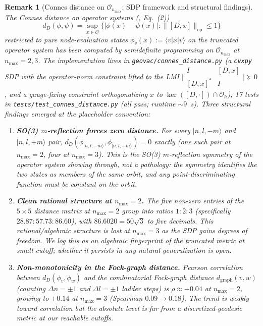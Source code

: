 \documentclass[11pt]{article}
\newtheorem{remark}{Remark}
\begin{document}
\begin{remark}[Connes distance on $\mathcal{O}_{n_{\max}}$: SDP framework
and structural findings]
\label{rem:connes_distance}
The Connes distance on operator systems
(\cite{connes_vs2021}, Eq.~(2))
\[
   d_D(\phi, \psi) = \sup_{x \in \mathcal{O}} \big\{ |\phi(x) - \psi(x)|
      : \|[D, x]\|_{\mathrm{op}} \le 1 \big\}
\]
restricted to pure node-evaluation states $\phi_v(x) := \langle v | x | v
\rangle$ on the truncated operator system has been computed by
semidefinite programming on $\mathcal{O}_{n_{\max}}$ at $n_{\max} = 2, 3$.
The implementation lives in \texttt{geovac/connes\_distance.py} (a
\texttt{cvxpy} SDP with the operator-norm constraint lifted to the LMI
$\bigl[\begin{smallmatrix} I & [D, x] \\ [D, x]^* & I \end{smallmatrix}\bigr]
\succeq 0$, and a gauge-fixing constraint orthogonalizing $x$ to
$\ker([D, \cdot]) \cap \mathcal{O}_h$); 17 tests in
\texttt{tests/test\_connes\_distance.py} (all pass; runtime ${\sim}9$~s).
Three structural findings emerged at the placeholder convention:

\begin{enumerate}
\item \textbf{SO(3) $m$-reflection forces zero distance.}  For every
   $|n, l, -m\rangle$ and $|n, l, +m\rangle$ pair, $d_D(\phi_{|n,l,-m\rangle},
   \phi_{|n,l,+m\rangle}) = 0$ exactly (one such pair at $n_{\max} = 2$,
   four at $n_{\max} = 3$).  This is the SO(3) $m$-reflection symmetry
   of the operator system showing through, not a pathology: the symmetry
   identifies the two states as members of the same orbit, and any
   point-discriminating function must be constant on the orbit.

\item \textbf{Clean rational structure at $n_{\max} = 2$.}  The five
   non-zero entries of the $5 \times 5$ distance matrix at $n_{\max} = 2$
   group into ratios $1 : 2 : 3$ (specifically $28.87 : 57.73 : 86.60$),
   with $86.6020 = 50\sqrt{3}$ to five decimals.  This rational/algebraic
   structure is lost at $n_{\max} = 3$ as the SDP gains degrees of
   freedom.  We log this as an algebraic fingerprint of the truncated
   metric at small cutoff; whether it persists in any natural
   generalization is open.

\item \textbf{Non-monotonicity in the Fock-graph distance.}  Pearson
   correlation between $d_D(\phi_v, \phi_w)$ and the combinatorial
   Fock-graph distance $d_{\mathrm{graph}}(v, w)$ (counting $\Delta n =
   \pm 1$ and $\Delta l = \pm 1$ ladder steps) is $\rho \approx -0.04$
   at $n_{\max} = 2$, growing to $+0.14$ at $n_{\max} = 3$ (Spearman
   $0.09 \to 0.18$).  The trend is weakly toward correlation but the
   absolute level is far from a discretized-geodesic metric at our
   reachable cutoffs.
\end{enumerate}


\end{remark}
\end{document}
